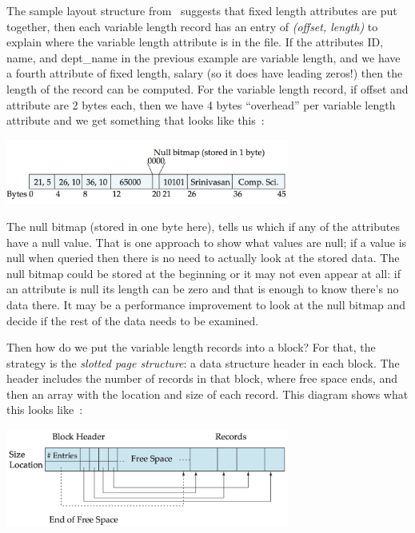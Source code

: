 The sample layout structure from~\cite{dsc} suggests that fixed length attributes are put together, then each variable length record has an entry of \textit{(offset, length)}  to explain where the variable length attribute is in the file. If the attributes ID, name, and dept\_name in the previous example are variable length, and we have a fourth attribute of fixed length, salary (so it does have leading zeros!) then the length of the record can be computed. For the variable length record, if offset and attribute are 2 bytes each, then we have 4 bytes ``overhead'' per variable length attribute and we get something that looks like this~\cite{dsc}:

\begin{center}
\includegraphics[width=0.7\textwidth]{images/variable-length-record}
\end{center}

The null bitmap (stored in one byte here), tells us which if any of the attributes have a null value. That is one approach to show what values are null; if a value is null when queried then there is no need to actually look at the stored data. The null bitmap could be stored at the beginning or it may not even appear at all: if an attribute is null its length can be zero and that is enough to know there's no data there. It may be a performance improvement to look at the null bitmap and decide if the rest of the data needs to be examined.

Then how do we put the variable length records into a block? For that, the strategy is the \textit{slotted page structure}: a data structure header in each block. The header includes the number of records in that block, where free space ends, and then an array with the location and size of each record. This diagram shows what this looks like~\cite{dsc}:

\begin{center}
\includegraphics[width=0.7\textwidth]{images/slotted-page}
\end{center}

